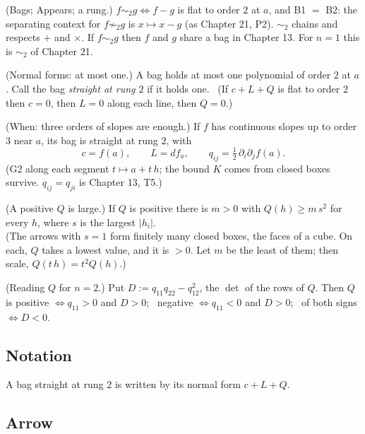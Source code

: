 \begin{lines}
\item[\lab{P1}] (Bags; Appears; a rung.) $f \sim_2 g \iff f - g$ is flat to order $2$ at $a$, and B1 $=$ B2: the separating context for $f \not\sim_2 g$ is $x \mapsto x - g$ (as Chapter 21, P2). $\sim_2$ chains and respects $+$ and $\times$. If $f \sim_2 g$ then $f$ and $g$ share a bag in Chapter 13. For $n = 1$ this is $\sim_2$ of Chapter 21.
\item[\lab{P2}] (Normal forms: at most one.) A bag holds at most one polynomial of order $2$ at $a$. Call the bag \emph{straight at rung $2$} if it holds one. \ (If $c + L + Q$ is flat to order $2$ then $c = 0$, then $L = 0$ along each line, then $Q = 0$.)
\item[\lab{P3}] (When: three orders of slopes are enough.) If $f$ has continuous slopes up to order $3$ near $a$, its bag is straight at rung $2$, with
\[
c = f(a), \qquad L = df_a, \qquad q_{ij} = \tfrac12\,\partial_i \partial_j f(a) .
\]
(G2 along each segment $t \mapsto a + t\,h$; the bound $K$ comes from closed boxes survive. $q_{ij} = q_{ji}$ is Chapter 13, T5.)
\item[\lab{P4}] (A positive $Q$ is large.) If $Q$ is positive there is $m > 0$ with $Q(h) \ge m\,s^2$ for every $h$, where $s$ is the largest $|h_i|$. \\
(The arrows with $s = 1$ form finitely many closed boxes, the faces of a cube. On each, $Q$ takes a lowest value, and it is $> 0$. Let $m$ be the least of them; then scale, $Q(t\,h) = t^2 Q(h)$.)
\item[\lab{P5}] (Reading $Q$ for $n = 2$.) Put $D := q_{11} q_{22} - q_{12}^2$, the $\det$ of the rows of $Q$. Then $Q$ is positive $\iff q_{11} > 0$ and $D > 0$; \ negative $\iff q_{11} < 0$ and $D > 0$; \ of both signs $\iff D < 0$.
\end{lines}

\subsection*{Notation}

\begin{lines}
\item[\lab{N1}] A bag straight at rung $2$ is written by its normal form $c + L + Q$.
\end{lines}

\subsection*{Arrow}

